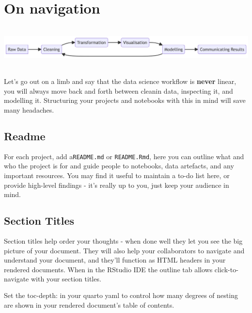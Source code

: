 \documentclass[
  letterpaper,
  DIV=11,
  numbers=noendperiod]{scrreprt}
\begin{document}
\section{On navigation}\label{on-navigation}

\includegraphics[width=9.55in,height=0.88in]{quarto_docs/code_best_practices_files/figure-latex/mermaid-figure-1.png}

Let's go out on a limb and say that the data science workflow is
\textbf{never} linear, you will always move back and forth between
cleanin data, inspecting it, and modelling it. Structuring your projects
and notebooks with this in mind will save many headaches.

\subsection{Readme}\label{readme}

For each project, add a\texttt{README.md} or \texttt{README.Rmd}, here
you can outline what and who the project is for and guide people to
notebooks, data artefacts, and any important resources. You may find it
useful to maintain a to-do list here, or provide high-level findings -
it's really up to you, just keep your audience in mind.

\subsection{Section Titles}\label{section-titles}

Section titles help order your thoughts - when done well they let you
see the big picture of your document. They will also help your
collaborators to navigate and understand your document, and they'll
function as HTML headers in your rendered documents. When in the RStudio
IDE the outline tab allows click-to-navigate with your section titles.

\begin{tcolorbox}[enhanced jigsaw, opacitybacktitle=0.6, breakable, title=\textcolor{quarto-callout-tip-color}{\faLightbulb}\hspace{0.5em}{Tip}, arc=.35mm, colframe=quarto-callout-tip-color-frame, colbacktitle=quarto-callout-tip-color!10!white, left=2mm, bottomrule=.15mm, opacityback=0, toprule=.15mm, bottomtitle=1mm, toptitle=1mm, titlerule=0mm, leftrule=.75mm, colback=white, rightrule=.15mm, coltitle=black]

Set the toc-depth: in your quarto yaml to control how many degrees of
nesting are shown in your rendered document's table of contents.

\end{tcolorbox}
\end{document}
